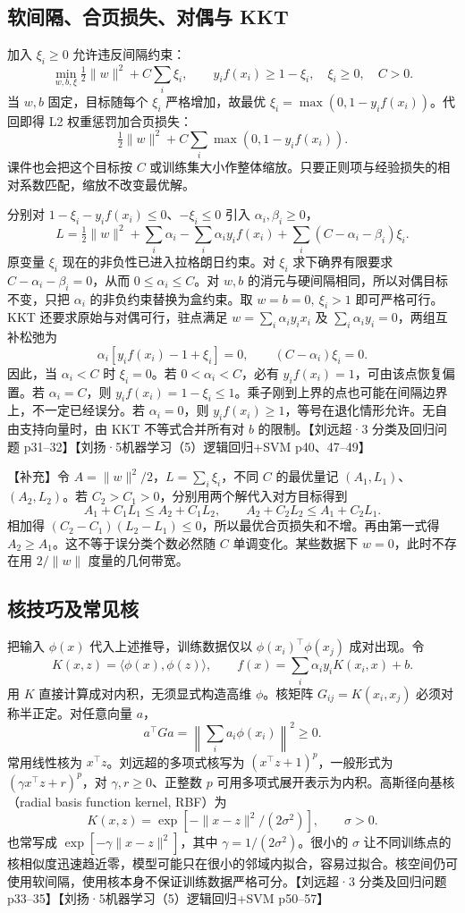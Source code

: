 \documentclass[UTF8,a4paper,zihao=-4,fontset=fandol]{ctexrep}
\begin{document}
\subsection*{软间隔、合页损失、对偶与 KKT}
加入 $\xi_i\ge0$ 允许违反间隔约束：
\[
 \min_{w,b,\xi}\tfrac12\|w\|^2+C\sum_i\xi_i,\qquad
 y_i f(x_i)\ge1-\xi_i,\quad \xi_i\ge0,\quad C>0.
\]
当 $w,b$ 固定，目标随每个 $\xi_i$ 严格增加，故最优 $\xi_i=\max(0,1-y_i f(x_i))$。代回即得 L2 权重惩罚加合页损失：
\[
 \tfrac12\|w\|^2+C\sum_i\max(0,1-y_i f(x_i)).
\]
课件也会把这个目标按 $C$ 或训练集大小作整体缩放。只要正则项与经验损失的相对系数匹配，缩放不改变最优解。

分别对 $1-\xi_i-y_i f(x_i)\le0$、$-\xi_i\le0$ 引入 $\alpha_i,\beta_i\ge0$，
\[
 L=\tfrac12\|w\|^2+\sum_i\alpha_i
    -\sum_i\alpha_i y_i f(x_i)
    +\sum_i(C-\alpha_i-\beta_i)\xi_i.
\]
原变量 $\xi_i$ 现在的非负性已进入拉格朗日约束。对 $\xi_i$ 求下确界有限要求 $C-\alpha_i-\beta_i=0$，从而 $0\le\alpha_i\le C$。对 $w,b$ 的消元与硬间隔相同，所以对偶目标不变，只把 $\alpha_i$ 的非负约束替换为盒约束。取 $w=b=0,\ \xi_i>1$ 即可严格可行。KKT 还要求原始与对偶可行，驻点满足 $w=\sum_i\alpha_i y_i x_i$ 及 $\sum_i\alpha_i y_i=0$，两组互补松弛为
\[
 \alpha_i[y_i f(x_i)-1+\xi_i]=0,\qquad
 (C-\alpha_i)\xi_i=0.
\]
因此，当 $\alpha_i<C$ 时 $\xi_i=0$。若 $0<\alpha_i<C$，必有 $y_i f(x_i)=1$，可由该点恢复偏置。若 $\alpha_i=C$，则 $y_i f(x_i)=1-\xi_i\le1$。乘子刚到上界的点也可能在间隔边界上，不一定已经误分。若 $\alpha_i=0$，则 $y_i f(x_i)\ge1$，等号在退化情形允许。无自由支持向量时，由 KKT 不等式合并所有对 $b$ 的限制。【刘远超·3 分类及回归问题 p31–32】【刘扬·5机器学习（5）逻辑回归+SVM p40、47–49】

【补充】令 $A=\|w\|^2/2$，$L=\sum_i\xi_i$，不同 $C$ 的最优量记 $(A_1,L_1)$、$(A_2,L_2)$。若 $C_2>C_1>0$，分别用两个解代入对方目标得到
\[
 A_1+C_1L_1\le A_2+C_1L_2,\qquad
 A_2+C_2L_2\le A_1+C_2L_1.
\]
相加得 $(C_2-C_1)(L_2-L_1)\le0$，所以最优合页损失和不增。再由第一式得 $A_2\ge A_1$。这不等于误分类个数必然随 $C$ 单调变化。某些数据下 $w=0$，此时不存在用 $2/\|w\|$ 度量的几何带宽。

\subsection*{核技巧及常见核}
把输入 $\phi(x)$ 代入上述推导，训练数据仅以 $\phi(x_i)^\top\phi(x_j)$ 成对出现。令
\[
 K(x,z)=\langle\phi(x),\phi(z)\rangle,\qquad
 f(x)=\sum_i\alpha_i y_iK(x_i,x)+b.
\]
用 $K$ 直接计算成对内积，无须显式构造高维 $\phi$。核矩阵 $G_{ij}=K(x_i,x_j)$ 必须对称半正定。对任意向量 $a$，
\[
 a^\top G a=\left\|\sum_i a_i\phi(x_i)\right\|^2\ge0.
\]
常用线性核为 $x^\top z$。刘远超的多项式核写为 $(x^\top z+1)^p$，一般形式为 $(\gamma x^\top z+r)^p$，对 $\gamma,r\ge0$、正整数 $p$ 可用多项式展开表示为内积。高斯径向基核（radial basis function kernel, RBF）为
\[
 K(x,z)=\exp[-\|x-z\|^2/(2\sigma^2)],\qquad \sigma>0.
\]
也常写成 $\exp[-\gamma\|x-z\|^2]$，其中 $\gamma=1/(2\sigma^2)$。很小的 $\sigma$ 让不同训练点的核相似度迅速趋近零，模型可能只在很小的邻域内拟合，容易过拟合。核空间仍可使用软间隔，使用核本身不保证训练数据严格可分。【刘远超·3 分类及回归问题 p33–35】【刘扬·5机器学习（5）逻辑回归+SVM p50–57】
\end{document}
